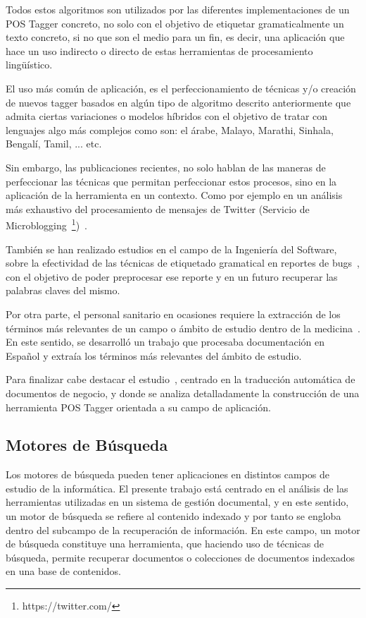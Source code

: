 \documentclass[runningheads,a4paper]{llncs}
\theoremstyle{break}
\begin{document}
Todos estos algoritmos son utilizados por las diferentes implementaciones de un POS Tagger concreto, no solo con el objetivo de etiquetar gramaticalmente un texto concreto, si no que son el medio para un fin, es decir, una aplicación que hace un uso indirecto o directo de estas herramientas de procesamiento lingüístico.

El uso más común de aplicación, es el perfeccionamiento de técnicas y/o creación de nuevos tagger basados en algún tipo de algoritmo descrito anteriormente que admita ciertas variaciones o modelos híbridos con el objetivo de tratar con lenguajes algo más complejos como son: el árabe, Malayo, Marathi, Sinhala, Bengalí, Tamil, ... etc.

Sin embargo, las publicaciones recientes, no solo hablan de las maneras de perfeccionar las técnicas que permitan perfeccionar estos procesos, sino en la aplicación de la herramienta en un contexto. Como por ejemplo en un análisis más exhaustivo del procesamiento de mensajes de Twitter (Servicio de Microblogging~\footnote{https://twitter.com/})~\cite{postagger:4}.

También se han realizado estudios en el campo de la Ingeniería del Software, sobre la efectividad de las técnicas de etiquetado gramatical en reportes de bugs~\cite{postagger:5}, con el objetivo de poder preprocesar ese reporte y en un futuro recuperar las palabras claves del mismo.

Por otra parte, el personal sanitario en ocasiones requiere la extracción de los términos más relevantes de un campo o ámbito de estudio dentro de la medicina~\cite{postagger:6}. En este sentido, se desarrolló un trabajo  que procesaba documentación en Español y extraía los términos más relevantes del ámbito de estudio.

Para finalizar cabe destacar el estudio~\cite{postagger:7}, centrado en la traducción automática de documentos de negocio, y donde se analiza detalladamente la construcción de una herramienta POS Tagger orientada a su campo de aplicación.

\subsection{Motores de Búsqueda}

Los motores de búsqueda pueden tener aplicaciones en distintos campos de estudio de la informática. El presente trabajo está centrado en el análisis de las herramientas utilizadas en un sistema de gestión documental, y en este sentido, un motor de búsqueda se refiere al contenido indexado y por tanto se engloba dentro del subcampo de la recuperación de información. En este campo, un motor de búsqueda constituye una herramienta, que haciendo uso de técnicas de búsqueda, permite recuperar documentos o colecciones de documentos indexados en una base de contenidos.
\end{document}
